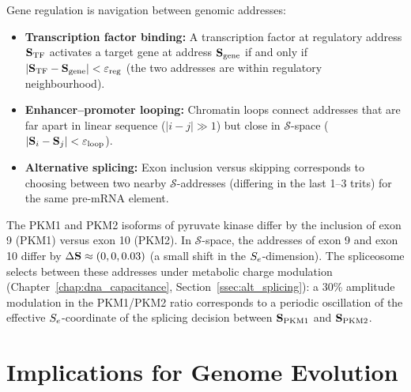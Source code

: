 \begin{proposition}
\label{prop:regulation_navigation}
Gene regulation is navigation between genomic addresses:
\begin{itemize}
  \item \textbf{Transcription factor binding:} A transcription factor
    at regulatory address $\mathbf{S}_{\mathrm{TF}}$ activates a target gene
    at address $\mathbf{S}_{\mathrm{gene}}$ if and only if
    $|\mathbf{S}_{\mathrm{TF}} - \mathbf{S}_{\mathrm{gene}}| < \varepsilon_{\mathrm{reg}}$
    (the two addresses are within regulatory neighbourhood).
  \item \textbf{Enhancer--promoter looping:} Chromatin loops connect
    addresses that are far apart in linear sequence ($|i - j| \gg 1$)
    but close in $\mathcal{S}$-space
    ($|\mathbf{S}_i - \mathbf{S}_j| < \varepsilon_{\mathrm{loop}}$).
  \item \textbf{Alternative splicing:} Exon inclusion versus skipping
    corresponds to choosing between two nearby $\mathcal{S}$-addresses
    (differing in the last 1--3 trits) for the same pre-mRNA element.
\end{itemize}
\end{proposition}

\begin{example}
\label{ex:alt_splicing_nav}
The PKM1 and PKM2 isoforms of pyruvate kinase differ by the inclusion
of exon 9 (PKM1) versus exon 10 (PKM2). In $\mathcal{S}$-space, the
addresses of exon 9 and exon 10 differ by $\Delta\mathbf{S} \approx (0, 0, 0.03)$
(a small shift in the $S_e$-dimension). The spliceosome selects between
these addresses under metabolic charge modulation (Chapter~\ref{chap:dna_capacitance},
Section~\ref{ssec:alt_splicing}): a 30\% amplitude modulation in the
PKM1/PKM2 ratio corresponds to a periodic oscillation of the effective
$S_e$-coordinate of the splicing decision between
$\mathbf{S}_{\mathrm{PKM1}}$ and $\mathbf{S}_{\mathrm{PKM2}}$.
\end{example}

\section{Implications for Genome Evolution}
\label{sec:evolution_implications}

